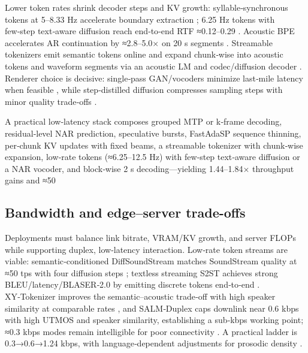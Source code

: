 \documentclass{article}
\begin{document}
Lower token rates shrink decoder steps and KV growth: syllable‑synchronous tokens at 5–8.33 Hz accelerate boundary extraction \cite{baade2024syllablelmlearningcoarsesemanticunitsspe}; 6.25 Hz tokens with few‑step text‑aware diffusion reach end‑to‑end RTF ≈0.12–0.29 \cite{wang2025tadicodectextawarediffusionspeechtokeniz}. Acoustic BPE accelerates AR continuation by ≈2.8–5.0× on 20 s segments \cite{shen2024acousticbpespeechgenerationdiscretetoken}. Streamable tokenizers emit semantic tokens online and expand chunk‑wise into acoustic tokens and waveform segments via an acoustic LM and codec/diffusion decoder \cite{turetzky2024lastlanguagemodelawarespeechtokenization,bai2025dmelspeechtokenizationmadesimple,yang2025diffsoundstreamefficientspeechtokenizati,vashishth2024stabspeechtokenizerassessmentbenchmark,zhao2024textlessstreamingspeechtranslationsemant}. Renderer choice is decisive: single‑pass GAN/vocoders minimize last‑mile latency when feasible \cite{wang2024evaluatingtextspeechsynthesislargediscre}, while step‑distilled diffusion compresses sampling steps with minor quality trade‑offs \cite{yang2025diffsoundstreamefficientspeechtokenizati}.

A practical low‑latency stack composes grouped MTP or k‑frame decoding, residual‑level NAR prediction, speculative bursts, FastAdaSP sequence thinning, per‑chunk KV updates with fixed beams, a streamable tokenizer with chunk‑wise expansion, low‑rate tokens (≈6.25–12.5 Hz) with few‑step text‑aware diffusion or a NAR vocoder, and block‑wise 2 s decoding—yielding 1.44–1.84× throughput gains and ≈50%

\subsection{Bandwidth and edge–server trade-offs} \label{subsec:Bandwidth and edge–server trade-offs}
Deployments must balance link bitrate, VRAM/KV growth, and server FLOPs while supporting duplex, low‑latency interaction. Low‑rate token streams are viable: semantic‑conditioned DiffSoundStream matches SoundStream quality at ≈50 tps with four diffusion steps \cite{yang2025diffsoundstreamefficientspeechtokenizati}; textless streaming S2ST achieves strong BLEU/latency/BLASER‑2.0 by emitting discrete tokens end‑to‑end \cite{zhao2024textlessstreamingspeechtranslationsemant}. XY‑Tokenizer improves the semantic–acoustic trade‑off with high speaker similarity at comparable rates \cite{gong2025xytokenizermitigatingsemanticacousticcon}, and SALM‑Duplex caps downlink near 0.6 kbps with high UTMOS and speaker similarity, establishing a sub‑kbps working point; ≈0.3 kbps modes remain intelligible for poor connectivity \cite{hu2025salmduplexefficientdirectmodelingspeechl,xue2025hhcodechighcompressionfidelitydiscretene}. A practical ladder is 0.3→0.6→1.24 kbps, with language‑dependent adjustments for prosodic density \cite{onda2025benchmarkingprosodyencodingdiscretespeec,zhang2025impactframeratesspeechtokenizercasestudy}.
\end{document}

